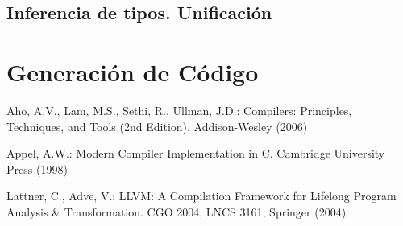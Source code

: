 \documentclass{llncs}
\begin{document}
\subsection{Inferencia de tipos. Unificación}

\vspace{10pt}
\section{Generación de Código}
\vspace{10pt}
\begin{thebibliography}{9}
Aho, A.V., Lam, M.S., Sethi, R., Ullman, J.D.: 
Compilers: Principles, Techniques, and Tools (2nd Edition). 
Addison-Wesley (2006)

Appel, A.W.: Modern Compiler Implementation in C. 
Cambridge University Press (1998)

Lattner, C., Adve, V.: 
LLVM: A Compilation Framework for Lifelong Program Analysis \& Transformation. 
CGO 2004, LNCS 3161, Springer (2004)
\end{thebibliography}
\end{document}

